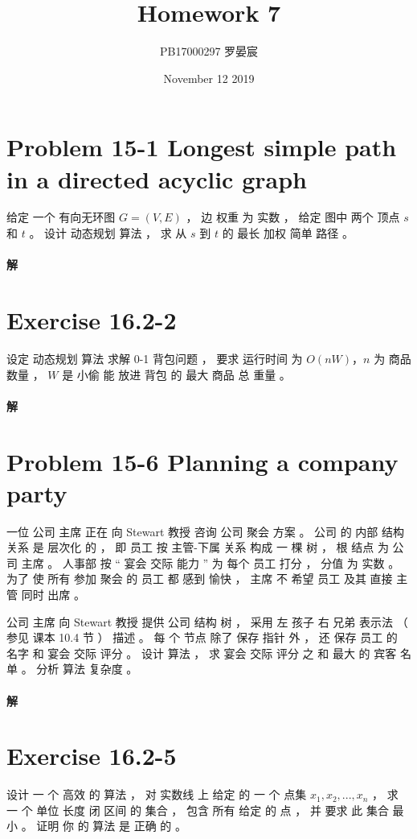 \documentclass{article}
\title{Homework 7}
\author{PB17000297 罗晏宸}
\date{November 12 2019}
\begin{document}
\maketitle

\section{Problem 15-1 Longest simple path in a directed acyclic graph}
给定 一个 有向无环图 $G = (V,E)$ ， 边 权重 为 实数 ， 给定 图中 两个 顶点 $s$ 和 $t$ 。 设计 动态规划 算法 ， 求 从 $s$ 到 $t$ 的 最长 加权 简单 路径 。

\paragraph{解}

\section{Exercise 16.2-2}
设定 动态规划 算法 求解 0-1 背包问题 ， 要求 运行时间 为 $O(nW)$，$n$ 为 商品 数量 ， $W$ 是 小偷 能 放进 背包 的 最大 商品 总 重量 。

\paragraph{解}


\section{Problem 15-6 Planning a company party}
一位 公司 主席 正在 向 Stewart 教授 咨询 公司 聚会 方案 。 公司 的 内部 结构 关系 是 层次化 的 ， 即 员工 按 主管-下属 关系 构成 一 棵 树 ， 根 结点 为 公司 主席 。 人事部 按 “ 宴会 交际 能力 ” 为 每个 员工 打分 ， 分值 为 实数 。 为了 使 所有 参加 聚会 的 员工 都 感到 愉快 ， 主席 不 希望 员工 及其 直接 主管 同时 出席 。
\par
公司 主席 向 Stewart 教授 提供 公司 结构 树 ， 采用 左 孩子 右 兄弟 表示法 （ 参见 课本 10.4 节 ） 描述 。 每 个 节点 除了 保存 指针 外 ， 还 保存 员工 的 名字 和 宴会 交际 评分 。 设计 算法 ， 求 宴会 交际 评分 之 和 最大 的 宾客 名单 。 分析  算法 复杂度 。

\paragraph{解}

\section{Exercise 16.2-5}
设计 一 个 高效 的 算法 ， 对 实数线 上 给定 的 一 个 点集 ${x_1,x_2,...,x_n}$ ， 求 一 个 单位 长度 闭 区间 的 集合 ， 包含 所有 给定 的 点 ， 并 要求 此 集合 最小 。 证明 你 的 算法 是 正确 的 。
\end{document}
